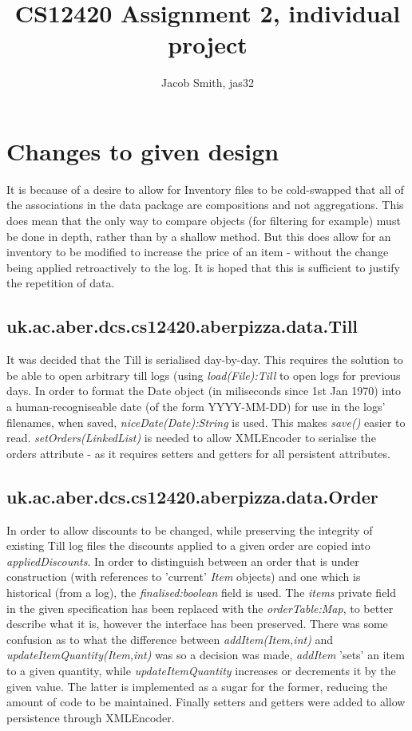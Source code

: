 \documentclass[11pt]{article} %
\title{CS12420 Assignment 2, individual project}
\author{Jacob Smith, jas32}
\begin{document}
\maketitle

\section{Changes to given design}
It is because of a desire to allow for Inventory files to be cold-swapped that all of the associations in the data package are compositions and not aggregations. This does mean that the only way to compare objects (for filtering for example) must be done in depth, rather than by a shallow method. But this does allow for an inventory to be modified to increase the price of an item - without the change being applied retroactively to the log. It is hoped that this is sufficient to justify the repetition of data.

\subsection{uk.ac.aber.dcs.cs12420.aberpizza.data.Till}
It was decided that the Till is serialised day-by-day. This requires the solution to be able to open arbitrary till logs (using \emph{load(File):Till} to open logs for previous days. In order to format the Date object (in miliseconds since 1st Jan 1970) into a human-recogniseable date (of the form YYYY-MM-DD) for use in the logs' filenames, when saved, \emph{niceDate(Date):String} is used. This makes \emph{save()} easier to read. \emph{setOrders(LinkedList)} is needed to allow XMLEncoder to serialise the orders attribute - as it requires setters and getters for all persistent attributes.

\subsection{uk.ac.aber.dcs.cs12420.aberpizza.data.Order}
In order to allow discounts to be changed, while preserving the integrity of existing Till log files the discounts applied to a given order are copied into \emph{appliedDiscounts}. In order to distinguish between an order that is under construction (with references to 'current' \emph{Item} objects) and one which is historical (from a log), the \emph{finalised:boolean} field is used. The \emph{items} private field in the given specification has been replaced with the \emph{orderTable:Map}, to better describe what it is, however the interface has been preserved. There was some confusion as to what the difference between \emph{addItem(Item,int)} and \emph{updateItemQuantity(Item,int)} was so a decision was made, \emph{addItem} 'sets' an item to a given quantity, while \emph{updateItemQuantity} increases or decrements it by the given value. The latter is implemented as a sugar for the former, reducing the amount of code to be maintained. Finally setters and getters were added to allow persistence through XMLEncoder.
\end{document}
